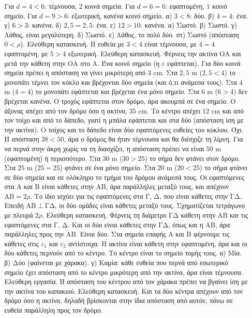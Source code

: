  Για $d=4<6$: τέμνουσα, $2$ κοινά σημεία. Για $d=6=6$: εφαπτομένη, $1$ κοινό σημείο. Για $d=9>6$: εξωτερική, κανένα κοινό σημείο.
 α) $3<8$: δύο. β) $4=4$: ένα. γ) $6>3$: κανένα. δ) $2{,}5=2{,}5$: ένα. ε) $12>10$: κανένα.
 α) Σωστό. β) Σωστό. γ) Λάθος, είναι μεγαλύτερη. δ) Σωστό. ε) Λάθος, το πολύ δύο. στ) Σωστό (απόσταση $0<\rho$).
 Ελεύθερη κατασκευή. Η ευθεία με $3<4$ είναι τέμνουσα, με $4=4$ εφαπτομένη, με $5>4$ εξωτερική.
 Ελεύθερη κατασκευή. Φέρνεις την ακτίνα $\mathrm{ΟΑ}$ και μετά την κάθετη στην $\mathrm{ΟΑ}$ στο $\mathrm{Α}$.
 Ένα κοινό σημείο (η $\varepsilon$ εφάπτεται). Για δύο κοινά σημεία πρέπει η απόσταση να γίνει μικρότερη από $3$ cm.
 Στα $2{,}5$ m ($2{,}5<4$) το μονοπάτι τέμνει τον κύκλο και βρέχονται δύο σημεία (και ό,τι ανάμεσα τους). Στα $4$ m ($4=4$) το μονοπάτι εφάπτεται και βρέχεται ένα μόνο σημείο. Στα $6$ m ($6>4$) δεν βρέχεται κανένα.
 Ο τροχός εφάπτεται στον δρόμο, άρα ακουμπά σε ένα σημείο. Ο άξονας απέχει από τον δρόμο όσο η ακτίνα, $35$ cm.
 Το κέντρο απέχει $12$ cm και από τον τοίχο και από το δάπεδο, γιατί η μπάλα εφάπτεται και στα δύο (απόσταση ίση με την ακτίνα). Ο τοίχος και το δάπεδο είναι δύο εφαπτόμενες ευθείες του κύκλου.
 Όχι. Η απόσταση $38<50$, άρα ο δρόμος θα ήταν τέμνουσα και θα διέσχιζε τη λίμνη. Για να περνά στην άκρη χωρίς να τη διασχίζει, η απόσταση πρέπει να είναι $50$ m (εφαπτομένη) ή περισσότερο.
 Στα $30$ m ($30>25$) το σήμα δεν φτάνει στον δρόμο. Στα $25$ m ($25=25$) φτάνει σε ένα μόνο σημείο. Στα $20$ m ($20<25$) το σήμα φτάνει σε δύο σημεία και σε ολόκληρο το τμήμα του δρόμου ανάμεσά τους.
 Οι εφαπτόμενες στα $\mathrm{Α}$ και $\mathrm{Β}$ είναι κάθετες στην $\mathrm{ΑΒ}$, άρα παράλληλες μεταξύ τους, και απέχουν $\mathrm{ΑΒ}=2\rho$. Το ίδιο ισχύει για τις εφαπτόμενες στα $\mathrm{Γ}$, $\mathrm{Δ}$, που είναι κάθετες στην $\mathrm{ΓΔ}$. Επειδή $\mathrm{ΑΒ}\perp\mathrm{ΓΔ}$, οι δύο ομάδες είναι κάθετες μεταξύ τους. Σχηματίζεται τετράγωνο με πλευρά $2\rho$.
 Ελεύθερη κατασκευή. Φέρνεις τη διάμετρο $\mathrm{ΓΔ}$ κάθετη στην $\mathrm{ΑΒ}$ και τις εφαπτόμενες στα $\mathrm{Γ}$, $\mathrm{Δ}$. Και οι δύο είναι κάθετες στην $\mathrm{ΓΔ}$, όπως και η $\mathrm{ΑΒ}$, άρα παράλληλες προς την $\mathrm{ΑΒ}$. Είναι δύο.
 Στα σημεία επαφής $\mathrm{Α}$ και $\mathrm{Β}$ φέρνουμε τις κάθετες στις $\varepsilon_1$ και $\varepsilon_2$ αντίστοιχα. Η ακτίνα είναι κάθετη στην εφαπτομένη, άρα και οι δύο κάθετες περνούν από το κέντρο. Το κέντρο είναι το σημείο τομής τους.
 α) Μία. β) Δύο (φαίνεται με χάρακα). γ) Καμία: κάθε ευθεία που περνά από εσωτερικό σημείο έχει απόσταση από το κέντρο μικρότερη από την ακτίνα, άρα είναι τέμνουσα.
 Ελεύθερη εργασία. Η απόσταση του κέντρου από τον χάρακα πρέπει να βγαίνει ίση με την ακτίνα του καπακιού.
 Ελεύθερη κατασκευή. Και τα δύο κέντρα απέχουν από τον δρόμο όσο η ακτίνα, δηλαδή βρίσκονται στην ίδια απόσταση από αυτόν, πάνω σε ευθεία παράλληλη προς τον δρόμο.
